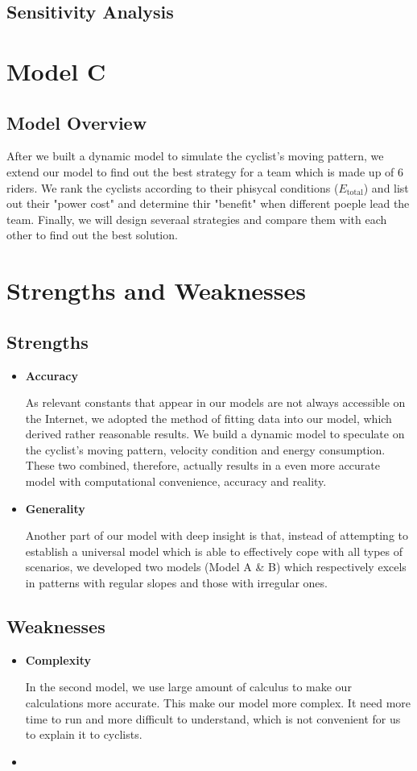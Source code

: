 \documentclass[12pt]{article}
\newcommand{\itembf}{\item \textbf}
\theoremstyle{definition}
\theoremstyle{remark}
\numberwithin{equation}{section}
\begin{document}
	\subsection{Sensitivity Analysis}
	\section{Model C}
	\subsection{Model Overview}
	After we built a dynamic model to simulate the cyclist's moving pattern, we extend our model to find out the best strategy for a team which is made up of 6 riders. We rank the cyclists according to their phisycal conditions ($E_\mathrm{total}$) and list out their "power cost" and determine thir "benefit" when different poeple lead the team. Finally, we will design severaal strategies and compare them with each other to find out the best solution.
	

	\section{Strengths and Weaknesses}
	\subsection*{Strengths}
	\begin{itemize}
		\item \textbf{Accuracy}
		
			As relevant constants that appear in our models are not always accessible on the Internet, we adopted the method of fitting data into our model, which derived rather reasonable results. We build a dynamic model to speculate on the cyclist's moving pattern, velocity condition and energy consumption. These two combined, therefore, actually results in a even more accurate model with computational convenience, accuracy and reality.
		\item \textbf{Generality}

			Another part of our model with deep insight is that, instead of attempting to establish a universal model which is able to effectively cope with all types of scenarios, we developed two models (Model A \& B) which respectively excels in patterns with regular slopes and those with irregular ones. 
	\end{itemize}
	\subsection*{Weaknesses}
	\begin{itemize}
		\itembf{Complexity}
		
			In the second model, we use large amount of calculus to make our calculations more accurate. This make our model more complex. It need more time to run and more difficult to understand, which is not convenient for us to explain it to cyclists.
		\itembf{}

	\end{itemize}
	\newpage
\end{document}

